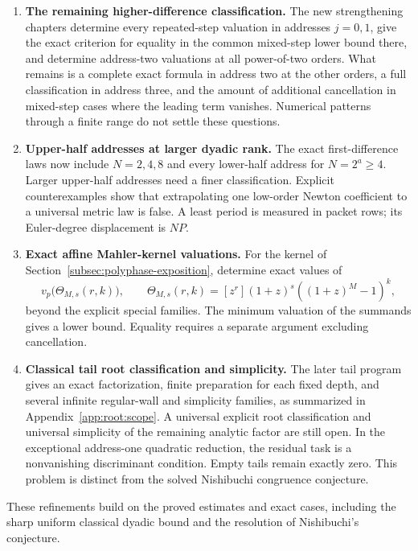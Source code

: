 \begin{enumerate}
\item \textbf{The remaining higher-difference classification.}
The new strengthening chapters determine every repeated-step valuation in addresses $j=0,1$, give the exact criterion for equality in the common mixed-step lower bound there, and determine address-two valuations at all power-of-two orders. What remains is a complete exact formula in address two at the other orders, a full classification in address three, and the amount of additional cancellation in mixed-step cases where the leading term vanishes. Numerical patterns through a finite range do not settle these questions.

\item \textbf{Upper-half addresses at larger dyadic rank.}
The exact first-difference laws now include $N=2,4,8$ and every lower-half address for $N=2^a\ge4$. Larger upper-half addresses need a finer classification. Explicit counterexamples show that extrapolating one low-order Newton coefficient to a universal metric law is false. A least period is measured in packet rows; its Euler-degree displacement is $NP$.

\item \textbf{Exact affine Mahler-kernel valuations.}
For the kernel of Section~\ref{subsec:polyphase-exposition}, determine exact
values of
\[
v_p\bigl(\Theta_{M,s}(r,k)\bigr),\qquad
\Theta_{M,s}(r,k)=[z^r](1+z)^s((1+z)^M-1)^k,
\]
beyond the explicit special families. The minimum valuation of the summands
gives a lower bound. Equality requires a separate argument excluding
cancellation.

\item \textbf{Classical tail root classification and simplicity.}
The later tail program gives an exact factorization, finite preparation for each fixed depth, and several infinite regular-wall and simplicity families, as summarized in Appendix~\ref{app:root:scope}. A universal explicit root classification and universal simplicity of the remaining analytic factor are still open. In the exceptional address-one quadratic reduction, the residual task is a nonvanishing discriminant condition. Empty tails remain exactly zero. This problem is distinct from the solved Nishibuchi congruence conjecture.
\end{enumerate}

These refinements build on the proved estimates and exact cases, including
the sharp uniform classical dyadic bound and the resolution of Nishibuchi's
conjecture.

